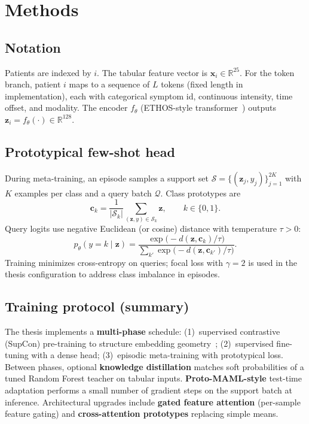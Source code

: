 \section{Methods}
\label{sec:methods}

\subsection{Notation}
Patients are indexed by $i$. The tabular feature vector is $\mathbf{x}_i \in \mathbb{R}^{25}$. For the token branch, patient $i$ maps to a sequence of $L$ tokens (fixed length in implementation), each with categorical symptom id, continuous intensity, time offset, and modality. The encoder $f_\theta$ (ETHOS-style transformer~\citep{sharafi2023ethos,vaswani2017attention}) outputs $\mathbf{z}_i = f_\theta(\cdot) \in \mathbb{R}^{128}$.

\subsection{Prototypical few-shot head}
During meta-training, an episode samples a support set $\mathcal{S} = \{(\mathbf{z}_j, y_j)\}_{j=1}^{2K}$ with $K$ examples per class and a query batch $\mathcal{Q}$. Class prototypes are
\begin{equation}
  \mathbf{c}_k = \frac{1}{|\mathcal{S}_k|} \sum_{(\mathbf{z},y)\in \mathcal{S}_k} \mathbf{z}, \qquad k \in \{0,1\}.
\end{equation}
Query logits use negative Euclidean (or cosine) distance with temperature $\tau{>}0$:
\begin{equation}
  p_\theta(y=k \mid \mathbf{z}) = \frac{\exp\bigl(-d(\mathbf{z}, \mathbf{c}_k)/\tau\bigr)}{\sum_{k'} \exp\bigl(-d(\mathbf{z}, \mathbf{c}_{k'})/\tau\bigr)}.
\end{equation}
Training minimizes cross-entropy on queries; focal loss with $\gamma{=}2$ is used in the thesis configuration to address class imbalance in episodes.

\subsection{Training protocol (summary)}
The thesis implements a \textbf{multi-phase} schedule: (1)~supervised contrastive (SupCon) pre-training to structure embedding geometry~\citep{khosla2020supervised}; (2)~supervised fine-tuning with a dense head; (3)~episodic meta-training with prototypical loss. Between phases, optional \textbf{knowledge distillation} matches soft probabilities of a tuned Random Forest teacher on tabular inputs. \textbf{Proto-MAML-style} test-time adaptation performs a small number of gradient steps on the support batch at inference. Architectural upgrades include \textbf{gated feature attention} (per-sample feature gating) and \textbf{cross-attention prototypes} replacing simple means.

